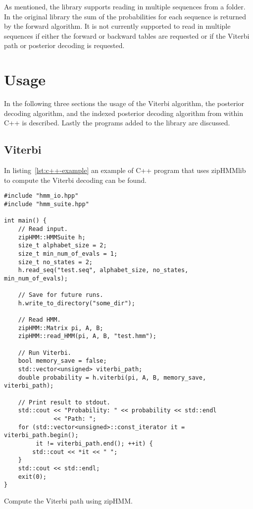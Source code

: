 As mentioned, the library supports reading in multiple sequences from a folder. In the
original library the sum of the probabilities for each sequence is returned by
the forward algorithm. It is not currently supported to read in multiple
sequences if either the forward or backward tables are requested or if
the Viterbi path or posterior decoding is requested.

\section{Usage}

In the following three sections the usage of the Viterbi algorithm, the
posterior decoding algorithm, and the indexed posterior decoding algorithm from
within C++ is described. Lastly the programs added to the library are
discussed.

\subsection{Viterbi}

In listing~\ref{lst:c++-example} an example of C++ program that uses zipHMMlib
to compute the Viterbi decoding can be found.

\begin{listing}
\begin{verbatim}
#include "hmm_io.hpp"
#include "hmm_suite.hpp"

int main() {
    // Read input.
    zipHMM::HMMSuite h;
    size_t alphabet_size = 2;
    size_t min_num_of_evals = 1;
    size_t no_states = 2;
    h.read_seq("test.seq", alphabet_size, no_states, min_num_of_evals);

    // Save for future runs.
    h.write_to_directory("some_dir");

    // Read HMM.
    zipHMM::Matrix pi, A, B;
    zipHMM::read_HMM(pi, A, B, "test.hmm");

    // Run Viterbi.
    bool memory_save = false;
    std::vector<unsigned> viterbi_path;
    double probability = h.viterbi(pi, A, B, memory_save, viterbi_path);

    // Print result to stdout.
    std::cout << "Probability: " << probability << std::endl
              << "Path: ";
    for (std::vector<unsigned>::const_iterator it = viterbi_path.begin();
         it != viterbi_path.end(); ++it) {
        std::cout << *it << " ";
    }
    std::cout << std::endl;
    exit(0);
}
\end{verbatim}
\caption{Compute the Viterbi path using zipHMM.}
\label{lst:c++-example}
\end{listing}

